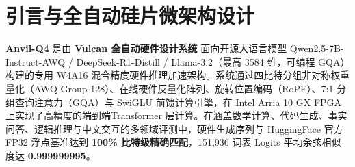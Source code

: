 \documentclass[11pt,a4paper]{article}
\begin{document}
\section{引言与全自动硅片微架构设计}

\textbf{Anvil-Q4} 是由 \textbf{Vulcan 全自动硬件设计系统} 面向开源大语言模型 Qwen2.5-7B-Instruct-AWQ /\allowbreak{} DeepSeek-R1-Distill /\allowbreak{} Llama-3.2（最高 3584 维，可编程 GQA） 构建的专用 W4A16 混合精度硬件推理加速架构。系统通过四比特分组非对称权重量化（AWQ Group-128）、在线硬件反量化阵列、旋转位置编码（RoPE）、7:1 分组查询注意力（GQA）与 SwiGLU 前馈计算引擎，在 Intel Arria 10 GX FPGA 上实现了高精度的端到端Transformer 层计算。在涵盖数学计算、代码生成、事实问答、逻辑推理与中文交互的多领域评测中，硬件生成序列与 HuggingFace 官方 FP32 浮点基准达到 \textbf{100\% 比特级精确匹配}，151,936 词表 Logits 平均余弦相似度达 \textbf{0.999999995}。

\vspace{2pt}
\end{document}
